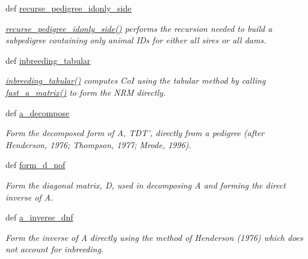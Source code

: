 \begin{CompactItemize}
def \hyperlink{namespacePyPedal_1_1pyp__nrm_88b1e0971e11743e8b521ef227e29e6f}{recurse\_\-pedigree\_\-idonly\_\-side}
\begin{CompactList}\small\item\em \hyperlink{namespacePyPedal_1_1pyp__nrm_88b1e0971e11743e8b521ef227e29e6f}{recurse\_\-pedigree\_\-idonly\_\-side()} performs the recursion needed to build a subpedigree containing only animal IDs for either all sires or all dams. \item\end{CompactList}\item 
def \hyperlink{namespacePyPedal_1_1pyp__nrm_ca22371da820f4c44272c0c49813bda2}{inbreeding\_\-tabular}
\begin{CompactList}\small\item\em \hyperlink{namespacePyPedal_1_1pyp__nrm_ca22371da820f4c44272c0c49813bda2}{inbreeding\_\-tabular()} computes Co\-I using the tabular method by calling \hyperlink{namespacePyPedal_1_1pyp__nrm_d86974b6cb70f5165d7f9b41b68b613e}{fast\_\-a\_\-matrix()} to form the NRM directly. \item\end{CompactList}\item 
def \hyperlink{namespacePyPedal_1_1pyp__nrm_1f381e4601f9cbfec699bc2b293fc5eb}{a\_\-decompose}
\begin{CompactList}\small\item\em Form the decomposed form of A, TDT', directly from a pedigree (after Henderson, 1976; Thompson, 1977; Mrode, 1996). \item\end{CompactList}\item 
def \hyperlink{namespacePyPedal_1_1pyp__nrm_43df241a5d555995a4bc7d3fd2ff01bf}{form\_\-d\_\-nof}
\begin{CompactList}\small\item\em Form the diagonal matrix, D, used in decomposing A and forming the direct inverse of A. \item\end{CompactList}\item 
def \hyperlink{namespacePyPedal_1_1pyp__nrm_9c6e5cd761d3de4d0501e0fa9c8b2977}{a\_\-inverse\_\-dnf}
\begin{CompactList}\small\item\em Form the inverse of A directly using the method of Henderson (1976) which does not account for inbreeding. \item\end{CompactList}\item 

\end{CompactItemize}

